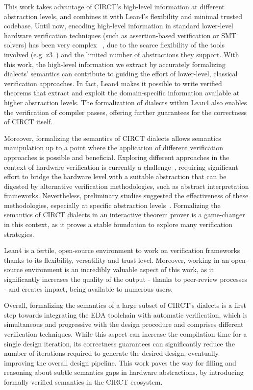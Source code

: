 \documentclass[sigconf,authorversion,nonacm, 11pt]{acmart}
\begin{document}
This work takes advantage of CIRCT's high-level information at different abstraction levels,
and combines it with Lean4's flexibility and minimal trusted codebase. 
Until now, encoding high-level information in standard lower-level hardware verification techniques 
(such as assertion-based verification or SMT solvers) has been very complex ~\cite{symbiyosys, witharana2022survey}, 
due to the scarce flexibility of the tools involved (e.g. z3~\cite{de2008z3}) and the limited number of abstractions they support. 
With this work, the high-level information we extract by accurately formalizing dialects' semantics can contribute to guiding the effort of lower-level, 
classical verification approaches.   
In fact, Lean4 makes it possible to write verified theorems that extract and exploit the domain-specific information 
available at higher abstraction levels. 
The formalization of dialects within Lean4 also enables the verification of compiler passes, offering further guarantees for the correctness
of CIRCT itself. 

Moreover, formalizing the semantics of CIRCT dialects allows semantics manipulation up to a point where the application of different verification approaches is possible and beneficial. 
Exploring different approaches in the context of hardware verification is currently a challenge~\cite{mukherjee2015hardware, malik2008hardware}, requiring significant effort to bridge the hardware level 
with a suitable abstraction that can be digested by alternative verification methodologies, such as abstract interpretation frameworks. 
Nevertheless, preliminary studies suggested the effectiveness of these methodologies, 
especially at specific abstraction levels~\cite{bernstein2021semantics}. 
Formalizing the semantics of CIRCT dialects in an interactive theorem prover is a game-changer in this context,
as it proves a stable foundation to explore many verification strategies.

Lean4 is a fertile, open-source environment to work on verification frameworks thanks to its flexibility, versatility and trust level. 
Moreover, working in an open-source environment is an incredibly valuable aspect of this work, as it significantly increases the quality of the output - thanks to peer-review processes - 
and creates impact, being available to numerous users.  

Overall, formalizing the semantics of a large subset of CIRCT's dialects is a first step towards integrating the EDA toolchain with automatic verification, 
which is simultaneous and progressive with the design procedure and comprises different verification techniques. 
While this aspect can increase the compilation time for a single design iteration, 
its correctness guarantees can significantly reduce the number of iterations required to generate the desired design, 
eventually improving the overall design pipeline.
This work paves the way for filling and reasoning about subtle semantics gaps in hardware abstractions, by introducing formally verified semantics 
in the CIRCT ecosystem.
\end{document}
